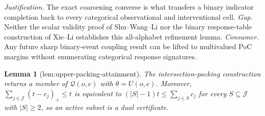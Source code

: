 \documentclass{article}
\newtheorem{lemma}{Lemma}
\begin{document}
\par\smallskip\noindent \textit{Justification.} The exact coarsening converse is what transfers a binary indicator completion back to every categorical observational and interventional cell. \textit{Gap.} Neither the scalar validity proof of Shu--Wang--Li nor the binary response-table construction of Xie--Li establishes this all-alphabet refinement lemma. \textit{Consumer.} Any future sharp binary-event coupling result can be lifted to multivalued PoC margins without enumerating categorical response signatures.

\begin{lemma}[lem:upper-packing-attainment]\label{lem:upper-packing-attainment}
The intersection-packing construction returns a member of \(\mathcal Q(o,e)\) with \(\theta=U(o,e)\). Moreover, \(\sum_{j\in\mathcal J}(t-c_j)_+\leq t\) is equivalent to \((|S|-1)t\leq\sum_{j\in S}c_j\) for every \(S\subseteq\mathcal J\) with \(|S|\geq2\), so an active subset is a dual certificate.
\end{lemma}
\end{document}
